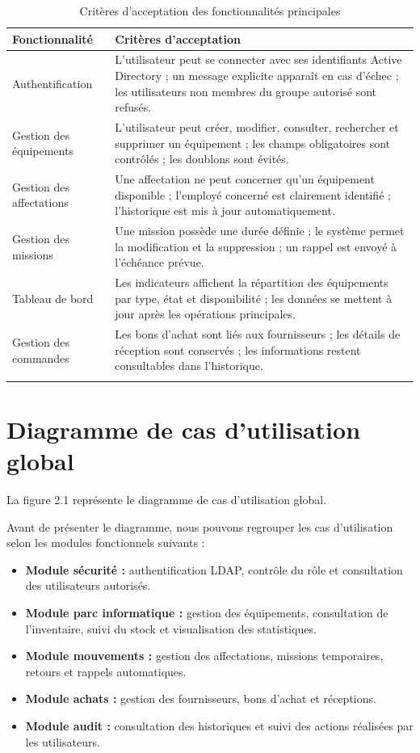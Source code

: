 \begin{longtable}{|m{4cm}|m{9cm}|}
\hline
\textbf{Fonctionnalité} & \textbf{Critères d'acceptation} \\
\hline
\endhead
\endfoot
\endlastfoot
\hline
Authentification & L'utilisateur peut se connecter avec ses identifiants Active Directory ; un message explicite apparaît en cas d'échec ; les utilisateurs non membres du groupe autorisé sont refusés. \\
\hline
Gestion des équipements & L'utilisateur peut créer, modifier, consulter, rechercher et supprimer un équipement ; les champs obligatoires sont contrôlés ; les doublons sont évités. \\
\hline
Gestion des affectations & Une affectation ne peut concerner qu'un équipement disponible ; l'employé concerné est clairement identifié ; l'historique est mis à jour automatiquement. \\
\hline
Gestion des missions & Une mission possède une durée définie ; le système permet la modification et la suppression ; un rappel est envoyé à l'échéance prévue. \\
\hline
Tableau de bord & Les indicateurs affichent la répartition des équipements par type, état et disponibilité ; les données se mettent à jour après les opérations principales. \\
\hline
Gestion des commandes & Les bons d'achat sont liés aux fournisseurs ; les détails de réception sont conservés ; les informations restent consultables dans l'historique. \\
\hline
\captionsetup{justification=centering,margin=1cm}
\caption{Critères d'acceptation des fonctionnalités principales}
\end{longtable}

\section{Diagramme de cas d’utilisation global}
La figure 2.1 représente  le diagramme de cas d'utilisation global.

Avant de présenter le diagramme, nous pouvons regrouper les cas d'utilisation selon les modules fonctionnels suivants :

\begin{itemize}[label=\textbullet,font=\normalsize]
    \item \textbf{Module sécurité :} authentification LDAP, contrôle du rôle et consultation des utilisateurs autorisés.
    \item \textbf{Module parc informatique :} gestion des équipements, consultation de l'inventaire, suivi du stock et visualisation des statistiques.
    \item \textbf{Module mouvements :} gestion des affectations, missions temporaires, retours et rappels automatiques.
    \item \textbf{Module achats :} gestion des fournisseurs, bons d'achat et réceptions.
    \item \textbf{Module audit :} consultation des historiques et suivi des actions réalisées par les utilisateurs.
\end{itemize}

